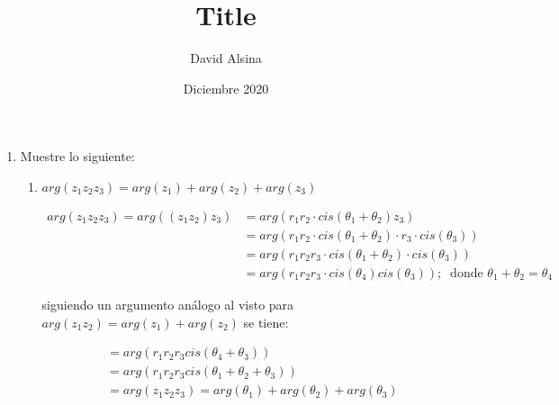 \documentclass[a4paper,12pt]{article}
\title{Title}
\author{David Alsina}
\date{Diciembre 2020}
\begin{document}
	\begin{enumerate}

		\item Muestre lo siguiente:

			\begin{enumerate}

				\item $arg(z_{1}z_{2}z_{3}) = arg(z_{1}) + arg(z_{2}) + arg(z_{3})$
				
					\begin{align*}
						arg(z_{1}z_{2}z_{3}) = arg((z_{1}z_{2})z_{3}) &= arg(r_{1}r_{2}\cdot cis(\theta_{1} + \theta_{2})z_{3})\\
						&= arg( r_{1}r_{2}\cdot cis(\theta_{1} + \theta_{2})\cdot r_{3} \cdot cis(\theta_{3}))\\
						&= arg( r_{1}r_{2}r_{3} \cdot cis(\theta_{1} + \theta_{2}) \cdot cis(\theta_{3}))\\
						&= arg( r_{1}r_{2}r_{3} \cdot cis(\theta_{4})cis(\theta_{3})); \;\; \text{donde $\theta_{1}+\theta_{2} = \theta_{4}$}
					\end{align*}

					\begin{center}
						siguiendo un argumento análogo al visto para $arg(z_{1}z_{2}) = arg(z_{1})+arg(z_{2})$ se tiene: 
					\end{center}
					\begin{align*}
						&= arg( r_{1}r_{2}r_{3} cis(\theta_{4}+\theta_{3}))\\
						&= arg( r_{1}r_{2}r_{3} cis(\theta_{1}+\theta_{2} + \theta_{3}))\\
						&= arg( z_{1}z_{2}z_{3} ) = arg(\theta_{1}) + arg(\theta_{2}) + arg(\theta_{3})
					\end{align*}

			\end{enumerate}

	\end{enumerate}
\end{document}
